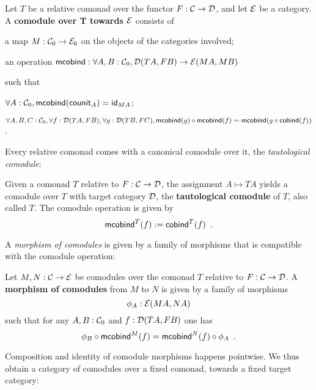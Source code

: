 \documentclass[conference,10pt]{IEEEtran}
\newcommand{\fat}[1]{\textbf{#1}}
\renewcommand{\alpha}{\phi}
\begin{document}
\begin{definition}\label{def:comodule}
 Let $T$ be a relative comonad over the functor $F:\C\to\D$, and let $\E$ be a category.
 A \fat{comodule over T towards $\E$} consists of
   \begin{packitem}
   \item a map $M:\C_0 \to \E_0$ on the objects of the categories involved;
   \item an operation $\mcobind: \forall A,B:\C_0, \D(TA,FB) \to \E(MA,MB)$
  \end{packitem}
  such that 
  \begin{packitem}
   \item $\forall A : \C_0, \mcobind(\counit_A) = \id_{MA}$;
   \item $\forall A,B,C:\C_0, \forall f : \D(TA,FB),\forall g:\D(TB,FC), \\
        \comp{\mcobind(f)}{\mcobind(g)} = \mcobind(\comp{\cobind(f)}{g})$ .
  \end{packitem}

\end{definition}

Every relative comonad comes with a canonical comodule over it, the \emph{tautological comodule}:

\begin{definition}\label{def:tautological_comodule}
  Given a comonad $T$ relative to $F:\C\to\D$, the assignment $A \mapsto TA$ yields a comodule over $T$ 
  with target category $\D$, the \textbf{tautological comodule} of $T$, also called $T$.
  The comodule operation is given by
    \[  \mcobind^T(f) := \cobind^T(f) \enspace . \]
\end{definition}


A \emph{morphism of comodules} is given by a family of morphisms that is compatible with 
the comodule operation:

\begin{definition}\label{def:morphism_of_comodules}
 Let $M, N : \C \to \E$ be comodules over the comonad $T$ relative to  $F:\C \to \D$.
 A \fat{morphism of comodules} from $M$ to $N$ is given by a family of morphisms 
   \[ \alpha_A:\E(MA,NA) \]
 such that for any $A,B:\C_0$ and $f : \D(TA,FB)$ one has
 \[   \comp{\mcobind^M(f)}{\alpha_B} = \comp{\alpha_A}{\mcobind^N(f)} \enspace . \]
\end{definition}


Composition and identity of comodule morphisms happens pointwise. We thus obtain a category of comodules
over a fixed comonad, towards a fixed target category:
\end{document}
